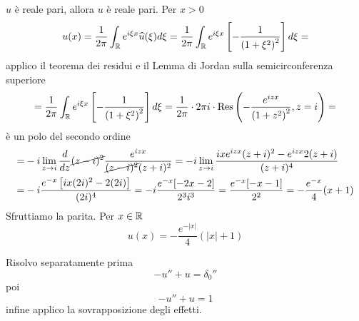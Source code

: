 $\hat{u}$ è reale pari, allora $u$ è reale pari. Per $x > 0$
\begin{equation*}
u(x) = \frac{1}{2\pi}\int_{\mathbb{R}} e^{i\xi x}\widehat{u}(\xi) d\xi = \frac{1}{2\pi}\int_{\mathbb{R}} e^{i\xi x}\left[ - \frac{1}{\left(1 + \xi^{2}\right)^{2}}\right] d\xi =
\end{equation*}
applico il teorema dei residui e il Lemma di Jordan sulla semicirconferenza superiore
\begin{equation*}
= \frac{1}{2\pi}\int_{\mathbb{R}} e^{i\xi x}\left[ - \frac{1}{\left(1 + \xi^{2}\right)^{2}}\right] d\xi = \frac{1}{2\pi} \cdot 2\pi i \cdot \operatorname{Res} \left(- \frac{e^{izx}}{\left(1 + z^{2}\right)^{2}}, z = i\right) =
\end{equation*}
è un polo del secondo ordine
\begin{equation*}
\begin{aligned}
= & - i\lim\limits_{z\rightarrow i}\frac{d}{dz}\cancel{(z - i)^{2}}\frac{e^{izx}}{\cancel{(z - i)^{2}}(z + i)^{2}} = - i\lim\limits_{z\rightarrow i}\frac{ixe^{izx}(z + i)^{2} - e^{izx} 2(z + i)}{(z + i)^{4}}\\
= & - i\frac{e^{- x}\left[ ix(2i)^{2} - 2(2i)\right]}{(2i)^{4}} = - i\frac{e^{- x}[ - 2x - 2]}{2^{3} i^{3}} = \frac{e^{- x}[ - x - 1]}{2^{2}} = - \frac{e^{- x}}{4}(x + 1)
\end{aligned}
\end{equation*}
Sfruttiamo la parita. Per $x\in \mathbb{R} $
\begin{equation*}
u(x) = - \frac{e^{- | x|}}{4}(| x| + 1)
\end{equation*}
\Soluzione

Risolvo separatamente prima
\begin{equation*}
- u'' + u = \delta_{0} ''
\end{equation*}
poi
\begin{equation*}
- u'' + u = 1
\end{equation*}
infine applico la sovrapposizione degli effetti.

